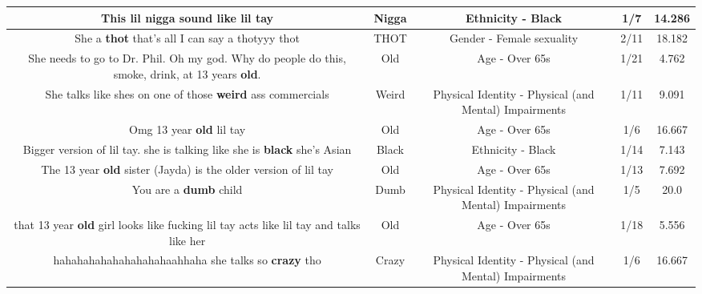 \documentclass[11pt]{article}
\newlength\mylength
\begin{document}
\begin{center}
\begin{longtable}{|C{.65\mylength}|C{.30\mylength}|C{.12\mylength}|C{.12\mylength}|C{.12\mylength}|}
  \small This lil \textbf{nigga} sound like lil tay\normalsize   & Nigga & Ethnicity - Black & 1/7 & 14.286 \\  \hline
  \small She a \textbf{thot} that's all I can say a thotyyy thot\normalsize   & THOT & Gender - Female sexuality & 2/11 & 18.182 \\  \hline
  \small She needs to go to Dr. Phil. Oh my god. Why do people do this, smoke, drink, at 13 years \textbf{old}.\normalsize   & Old & Age - Over 65s & 1/21 & 4.762 \\  \hline
  \small She talks like shes on one of those \textbf{weird} ass commercials\normalsize   & Weird & Physical Identity - Physical (and Mental) Impairments & 1/11 & 9.091 \\  \hline
  \small Omg 13 year \textbf{old} lil tay\normalsize   & Old & Age - Over 65s & 1/6 & 16.667 \\  \hline
  \small Bigger version of lil tay. she is  talking like she is  \textbf{black} she's Asian\normalsize   & Black & Ethnicity - Black & 1/14 & 7.143 \\  \hline
  \small The 13 year \textbf{old} sister (Jayda) is the older version of lil tay\normalsize   & Old & Age - Over 65s & 1/13 & 7.692 \\  \hline
  \small You are a \textbf{dumb} child\normalsize   & Dumb & Physical Identity - Physical (and Mental) Impairments & 1/5 & 20.0 \\  \hline
  \small that 13 year \textbf{old} girl looks like fucking lil tay acts like lil tay and talks like her\normalsize   & Old & Age - Over 65s & 1/18 & 5.556 \\  \hline
  \small hahahahahahahahahahaahhaha she talks so \textbf{crazy} tho\normalsize   & Crazy & Physical Identity - Physical (and Mental) Impairments & 1/6 & 16.667 \\  \hline

\end{longtable}
\end{center}
\end{document}
